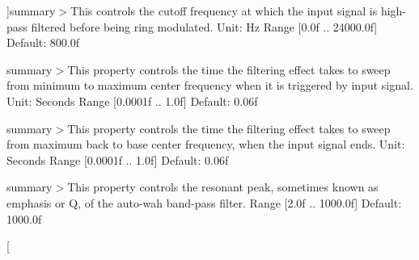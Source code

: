 \begin{Desc}
\begin{description}
{}]summary$>$This controls the cutoff frequency at which the input signal is high-\/pass filtered before being ring modulated. Unit\-: Hz Range \mbox{[}0.\-0f .. 24000.\-0f\mbox{]} Default\-: 800.\-0f\item[{\em 
\hypertarget{namespace_open_t_k_1_1_audio_1_1_open_a_l_aa0356299908369b4365d28572c0ec20ba039487c78768c7898f07fee8621eb819}{Ring\-Modulator\-Highpass\-Cutoff}\label{namespace_open_t_k_1_1_audio_1_1_open_a_l_aa0356299908369b4365d28572c0ec20ba039487c78768c7898f07fee8621eb819}
}]summary$>$This property controls the time the filtering effect takes to sweep from minimum to maximum center frequency when it is triggered by input signal. Unit\-: Seconds Range \mbox{[}0.\-0001f .. 1.\-0f\mbox{]} Default\-: 0.\-06f\item[{\em 
\hypertarget{namespace_open_t_k_1_1_audio_1_1_open_a_l_aa0356299908369b4365d28572c0ec20ba4905cf3f9c09f1b52213b956207674d7}{Autowah\-Attack\-Time}\label{namespace_open_t_k_1_1_audio_1_1_open_a_l_aa0356299908369b4365d28572c0ec20ba4905cf3f9c09f1b52213b956207674d7}
}]summary$>$This property controls the time the filtering effect takes to sweep from maximum back to base center frequency, when the input signal ends. Unit\-: Seconds Range \mbox{[}0.\-0001f .. 1.\-0f\mbox{]} Default\-: 0.\-06f\item[{\em 
\hypertarget{namespace_open_t_k_1_1_audio_1_1_open_a_l_aa0356299908369b4365d28572c0ec20ba0cffd6640e54b4c8cb57b11fa3c6326c}{Autowah\-Release\-Time}\label{namespace_open_t_k_1_1_audio_1_1_open_a_l_aa0356299908369b4365d28572c0ec20ba0cffd6640e54b4c8cb57b11fa3c6326c}
}]summary$>$This property controls the resonant peak, sometimes known as emphasis or Q, of the auto-\/wah band-\/pass filter. Range \mbox{[}2.\-0f .. 1000.\-0f\mbox{]} Default\-: 1000.\-0f\item[{\em 
}
\end{description}
\end{Desc}
